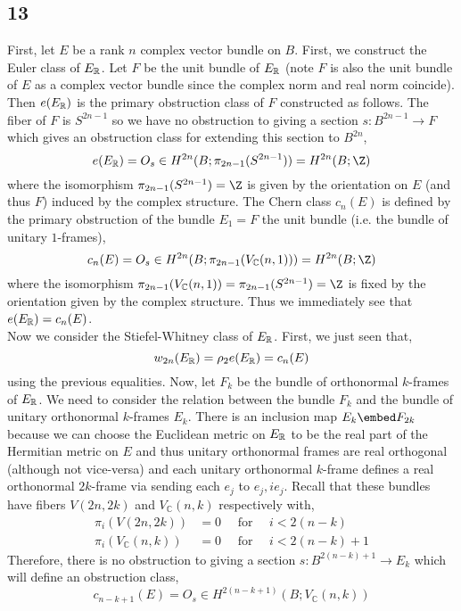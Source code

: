 \documentclass[12pt]{extarticle}
\newcommand{\C}{\mathbb{C}}
\begin{document}
\subsection{13}

First, let $E$ be a rank $n$ complex vector bundle on $B$. First, we construct the Euler class of $E_{\mathbb{R}}$. Let $F$ be the unit bundle of $E_{\mathbb{R}}$ (note $F$ is also the unit bundle of $E$ as a complex vector bundle since the complex norm and real norm coincide). Then $e(E_{\mathbb{R}})$ is the primary obstruction class of $F$ constructed as follows. The fiber of $F$ is $S^{2n - 1}$ so we have no obstruction to giving a section $s : B^{2n-1} \to F$ which gives an obstruction class for extending this section to $B^{2n}$,
\[ e(E_\R) = O_s \in H^{2n}(B; \pi_{2n-1}(S^{2n - 1})) = H^{2n}(B; \Z) \]
where the isomorphism $\pi_{2n - 1}(S^{2n - 1}) = \Z$ is given by the orientation on $E$ (and thus $F$) induced by the complex structure. The Chern class $c_n(E)$ is defined by the primary obstruction of the bundle $E_1 = F$ the unit bundle (i.e. the bundle of unitary $1$-frames),
\[ c_n(E) = O_s \in H^{2n}(B; \pi_{2n - 1}(V_\C(n, 1))) = H^{2n}(B; \Z) \]
where the isomorphism $\pi_{2n-1} (V_\C(n,1)) = \pi_{2n-1}(S^{2n - 1}) = \Z$ is fixed by the orientation given by the complex structure. Thus we immediately see that $e(E_{\mathbb{R}}) = c_n(E)$. 
\bigskip\\
Now we consider the Stiefel-Whitney class of $E_{\mathbb{R}}$. First, we just seen that,
\[ w_{2n}(E_{\mathbb{R}}) = \rho_2 e(E_{\mathbb{R}}) = c_n(E) \]
using the previous equalities. Now, let $F_k$ be the bundle of orthonormal $k$-frames of $E_{\mathbb{R}}$. We need to consider the relation between the bundle $F_k$ and the bundle of unitary orthonormal $k$-frames $E_k$. There is an inclusion map $E_k \embed F_{2k}$ because we can choose the Euclidean metric on $E_{\mathbb{R}}$ to be the real part of the Hermitian metric on $E$ and thus unitary orthonormal frames are real orthogonal (although not vice-versa) and each unitary orthonormal $k$-frame defines a real orthonormal $2k$-frame via sending each $e_j$ to $e_j, i e_j$. Recall that these bundles have fibers $V(2n, 2k)$ and $V_\C(n, k)$ respectively with,
\begin{align*}
\pi_i(V(2n, 2k)) &= 0 \quad \text{ for } \quad i < 2(n - k) 
\\
\pi_i(V_\C(n, k)) &= 0 \quad \text{ for } \quad i < 2 (n - k) + 1
\end{align*} 
Therefore, there is no obstruction to giving a section $s : B^{2 (n - k) + 1} \to E_k$ which will define an obstruction class,
\[ c_{n - k + 1}(E) = O_s \in H^{2(n - k + 1)}(B; V_\C(n, k)) \]
\end{document}
